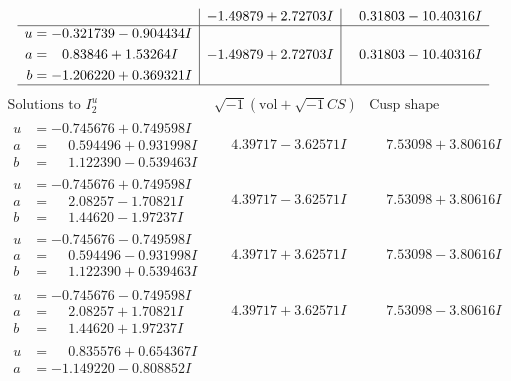 \documentclass[1p]{elsarticle_modified}
\theoremstyle{definition}
\newcommand{\I}{\sqrt{-1}}
\begin{document}
$$\begin{array}{c|c|c}
 & -1.49879 + 2.72703 I & \phantom{-}0.31803 - 10.40316 I \\ \hline\begin{aligned}
u &= -0.321739 - 0.904434 I \\
a &= \phantom{-}0.83846 + 1.53264 I \\
b &= -1.206220 + 0.369321 I\end{aligned}
 & -1.49879 + 2.72703 I & \phantom{-}0.31803 - 10.40316 I\\
 \hline 
 \end{array}$$\newpage$$\begin{array}{c|c|c}  
\text{Solutions to }I^u_{2}& \I (\text{vol} + \sqrt{-1}CS) & \text{Cusp shape}\\
 \hline 
\begin{aligned}
u &= -0.745676 + 0.749598 I \\
a &= \phantom{-}0.594496 + 0.931998 I \\
b &= \phantom{-}1.122390 - 0.539463 I\end{aligned}
 & \phantom{-}4.39717 - 3.62571 I & \phantom{-}7.53098 + 3.80616 I \\ \hline\begin{aligned}
u &= -0.745676 + 0.749598 I \\
a &= \phantom{-}2.08257 - 1.70821 I \\
b &= \phantom{-}1.44620 - 1.97237 I\end{aligned}
 & \phantom{-}4.39717 - 3.62571 I & \phantom{-}7.53098 + 3.80616 I \\ \hline\begin{aligned}
u &= -0.745676 - 0.749598 I \\
a &= \phantom{-}0.594496 - 0.931998 I \\
b &= \phantom{-}1.122390 + 0.539463 I\end{aligned}
 & \phantom{-}4.39717 + 3.62571 I & \phantom{-}7.53098 - 3.80616 I \\ \hline\begin{aligned}
u &= -0.745676 - 0.749598 I \\
a &= \phantom{-}2.08257 + 1.70821 I \\
b &= \phantom{-}1.44620 + 1.97237 I\end{aligned}
 & \phantom{-}4.39717 + 3.62571 I & \phantom{-}7.53098 - 3.80616 I \\ \hline\begin{aligned}
u &= \phantom{-}0.835576 + 0.654367 I \\
a &= -1.149220 - 0.808852 I \\

\end{aligned}
\end{array}$$
\end{document}
